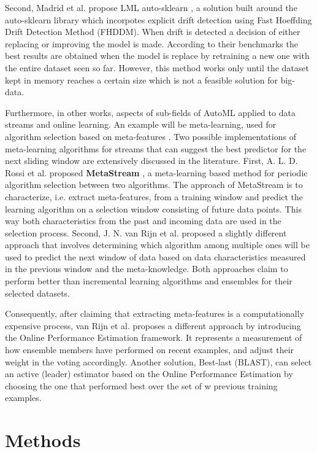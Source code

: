 \documentclass{sig-alternate-br}
\begin{document}
Second, Madrid et al. propose LML auto-sklearn \cite{madrid2019towards}, a solution built around the auto-sklearn library which incorpotes explicit drift detection using Fast Hoeffding Drift Detection Method (FHDDM). When drift is detected a decision of either replacing or improving the model is made. According to their benchmarks the best results are obtained when the model is replace by retraining a new one with the entire dataset seen so far. However, this method works only until the dataset kept in memory reaches a certain size which is not a feasible solution for big-data.

Furthermore, in other works, aspects of sub-fields of AutoML applied to data streams and online learning. An example will be meta-learning, used for algorithm selection based on meta-features \cite{rossi2017guidance}. Two possible implementations of meta-learning algorithms for streams that can suggest the best predictor for the next sliding window are extensively discussed in the literature. First, A. L. D. Rossi et al. proposed \textbf{MetaStream} \cite{rossi2014metastream}, a meta-learning based method for periodic algorithm selection between two algorithms. The approach of MetaStream is to characterize, i.e. extract meta-features, from a training window and predict the learning algorithm on a selection window consisting of future data points. This way both characteristics from the past and incoming data are used in the selection process. Second, J. N. van Rijn et al. \cite{van2014algorithm} proposed a slightly different approach that involves determining which algorithm among multiple ones will be used to predict the next window of data based on data characteristics measured in the previous window and the meta-knowledge. Both approaches claim to perform better than incremental learning algorithms and ensembles for their selected datasets.

Consequently, after claiming that extracting meta-features is a computationally expensive process, van Rijn et al. \cite{van2018online} proposes a different approach by introducing the Online Performance Estimation framework. It represents a measurement of how ensemble members have performed on recent examples, and adjust their weight in the voting accordingly. Another solution, Best-last (BLAST), can select an active (leader) estimator based on the Online Performance Estimation by choosing the one that performed best over the set of w previous training examples.

\section{Methods}
\end{document}
